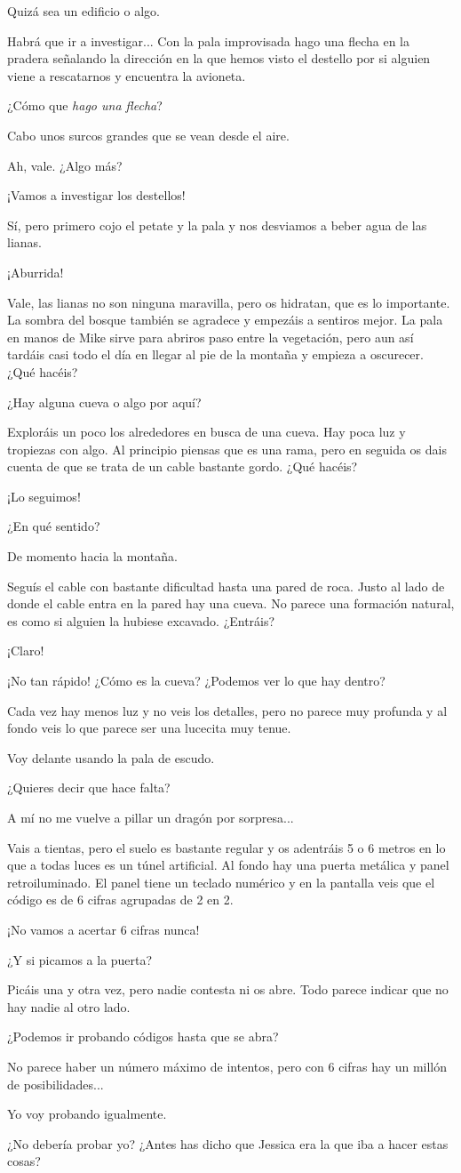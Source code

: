 \documentclass[10pt, a5paper, twocolumn]{article}
\newenvironment{dialogue}
    {\begin{description}[leftmargin=!,align=right,labelwidth=0.cm]}
    {\end{description}}
\newcommand\A{\item[\raisebox{-0.25em}{\scalebox{0.75}{\bctetraedre}}]}
\newcommand\B{\item[\raisebox{-0.25em}{\scalebox{0.75}{\bccube}}]}
\newcommand\E{\item[\raisebox{-0.25em}{\scalebox{0.75}{\bcicosaedre}}]}
\begin{document}
\begin{dialogue}
        \A Quizá sea un edificio o algo.
        \B Habrá que ir a investigar... Con la pala improvisada hago una flecha en la pradera señalando la dirección en la que hemos visto el destello por si alguien viene a rescatarnos y encuentra la avioneta.
        \E ¿Cómo que \emph{hago una flecha}?
        \B Cabo unos surcos grandes que se vean desde el aire.
        \E Ah, vale. ¿Algo más?
        \A ¡Vamos a investigar los destellos!
        \B Sí, pero primero cojo el petate y la pala y nos desviamos a beber agua de las lianas.
        \A ¡Aburrida!
        \E Vale, las lianas no son ninguna maravilla, pero os hidratan, que es lo importante. La sombra del bosque también se agradece y empezáis a sentiros mejor. La pala en manos de Mike sirve para abriros paso entre la vegetación, pero aun así tardáis casi todo el día en llegar al pie de la montaña y empieza a oscurecer. ¿Qué hacéis?
        \A ¿Hay alguna cueva o algo por aquí?
        \E Exploráis un poco los alrededores en busca de una cueva. Hay poca luz y tropiezas con algo. Al principio piensas que es una rama, pero en seguida os dais cuenta de que se trata de un cable bastante gordo. ¿Qué hacéis?
        \B ¡Lo seguimos!
        \E ¿En qué sentido?
        \B De momento hacia la montaña.
        \E Seguís el cable con bastante dificultad hasta una pared de roca. Justo al lado de donde el cable entra en la pared hay una cueva. No parece una formación natural, es como si alguien la hubiese excavado. ¿Entráis?
        \A ¡Claro!
        \B ¡No tan rápido! ¿Cómo es la cueva? ¿Podemos ver lo que hay dentro?
        \E Cada vez hay menos luz y no veis los detalles, pero no parece muy profunda y al fondo veis lo que parece ser una lucecita muy tenue.
        \B Voy delante usando la pala de escudo.
        \A ¿Quieres decir que hace falta?
        \B A mí no me vuelve a pillar un dragón por sorpresa...
        \E Vais a tientas, pero el suelo es bastante regular y os adentráis 5 o 6 metros en lo que a todas luces es un túnel artificial. Al fondo hay una puerta metálica y panel retroiluminado. El panel tiene un teclado numérico y en la pantalla veis que el código es de 6 cifras agrupadas de 2 en 2.
        \B ¡No vamos a acertar 6 cifras nunca!
        \A ¿Y si picamos a la puerta?
        \E Picáis una y otra vez, pero nadie contesta ni os abre. Todo parece indicar que no hay nadie al otro lado.
        \B ¿Podemos ir probando códigos hasta que se abra?
        \E No parece haber un número máximo de intentos, pero con 6 cifras hay un millón de posibilidades...
        \B Yo voy probando igualmente.
        \A ¿No debería probar yo? ¿Antes has dicho que Jessica era la que iba a hacer estas cosas?

\end{dialogue}
\end{document}
